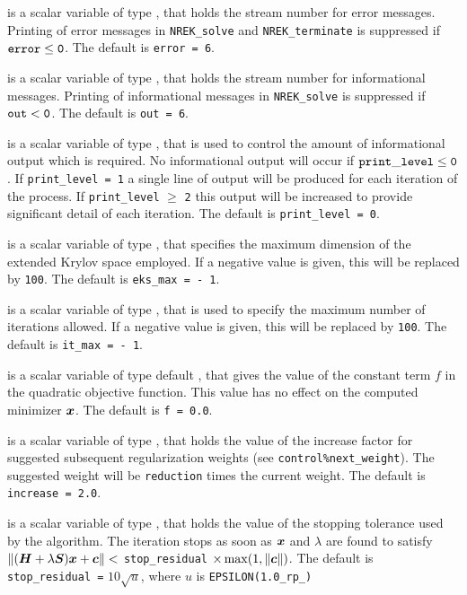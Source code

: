\documentclass{galahad}
\newcommand{\packagename}{NREK}
\begin{document}
\begin{description}
 is a scalar variable of type \integer, that holds the
stream number for error messages.
Printing of error messages in
{\tt \packagename\_solve} and {\tt \packagename\_terminate}
is suppressed if ${\tt error} \leq {\tt 0}$.
The default is {\tt error = 6}.

 is a scalar variable of type \integer, that holds the
stream number for informational messages.
Printing of informational messages in
{\tt \packagename\_solve} is suppressed if ${\tt out} < {\tt 0}$.
The default is {\tt out = 6}.

 is a scalar variable of type \integer,
that is used
to control the amount of informational output which is required. No
informational output will occur if ${\tt print\_level} \leq {\tt 0}$. If
{\tt print\_level = 1} a single line of output will be produced for each
iteration of the process. If {\tt print\_level} $\geq$ {\tt 2} this output
will be increased to provide significant detail of each iteration.
The default is {\tt print\_level = 0}.

 is a scalar variable of type \integer, that specifies
the maximum dimension of the extended Krylov space employed. 
If a negative value is given, this will be replaced by {\tt 100}.
The default is {\tt eks\_max = - 1}.

 is a scalar variable of type \integer, that is used
to specify the maximum number of iterations allowed.
If a negative value is given, this will be replaced by {\tt 100}.
The default is {\tt it\_max = - 1}.

 is a scalar variable of type default
\realdp, that gives the value of the constant term $f$ in the
quadratic objective function. This value has no effect on the
computed minimizer ${\bm{x}}$. The default is {\tt f = 0.0}.

 is a scalar variable of type \realdp, that holds the value
of the increase factor for suggested subsequent regularization weights
(see {\tt control\%next\_weight}).
The suggested weight will be {\tt reduction} times the
current weight.
The default is {\tt increase = 2.0}.

 is a scalar variable of type \realdp, that holds
the value of the stopping tolerance used by the algorithm. The
iteration stops as soon as ${\bm{x}}$ and $\lambda$ are found to satisfy
$\| ( {\bm{H}} + \lambda {\bm{S}} ) {\bm{x}} + {\bm{c}} \| <$ {\tt stop\_residual} 
$\times \max( 1, \|{\bm{c}}\| )$.
The default is {\tt stop\_residual =} $10\sqrt{u}$,
where $u$ is {\tt EPSILON(1.0\_rp\_)}


\end{description}
\end{document}
